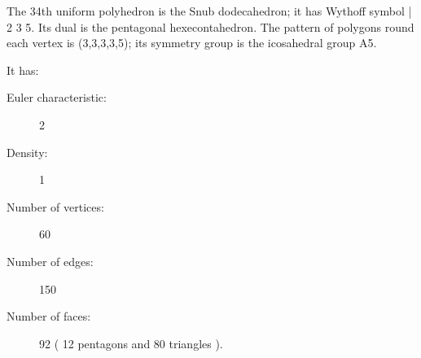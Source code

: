 The 34th uniform polyhedron is the Snub dodecahedron; it has Wythoff symbol | 2 3 5. Its dual is the pentagonal hexecontahedron. The pattern of polygons round each vertex is (3,3,3,3,5); its symmetry group is the icosahedral group A5.\par
It has:
\begin{description}
\item[Euler characteristic:] 2
\item[Density:] 1
\item[Number of vertices:] 60
\item[Number of edges:]  150
\item[Number of faces:] 92 ( 12 pentagons and 80 triangles ).
\end{description}  
  